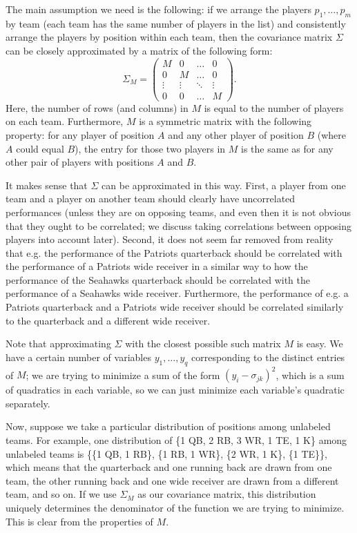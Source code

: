 \documentclass[12pt, final, onecolumn, titlepage]{article}
\theoremstyle{definition}
\begin{document}
The main assumption we need is the following: if we arrange the players $p_1, \dots, p_m$ by team (each team has the same number of players in the list) and consistently arrange the players by position within each team, then the covariance matrix $\Sigma$ can be closely approximated by a matrix of the following form:
\[\Sigma_M = \begin{pmatrix}M&0&\dots&0 \\ 0&M&\dots&0 \\ \vdots & \vdots & \ddots & \vdots \\ 0 & 0 & \dots & M\end{pmatrix}.\]
Here, the number of rows (and columns) in $M$ is equal to the number of players on each team. Furthermore, $M$ is a symmetric matrix with the following property: for any player of position $A$ and any other player of position $B$ (where $A$ could equal $B$), the entry for those two players in $M$ is the same as for any other pair of players with positions $A$ and $B$.

It makes sense that $\Sigma$ can be approximated in this way. First, a player from one team and a player on another team should clearly have uncorrelated performances (unless they are on opposing teams, and even then it is not obvious that they ought to be correlated; we discuss taking correlations between opposing players into account later). Second, it does not seem far removed from reality that e.g. the performance of the Patriots quarterback should be correlated with the performance of a Patriots wide receiver in a similar way to how the performance of the Seahawks quarterback should be correlated with the performance of a Seahawks wide receiver. Furthermore, the performance of e.g. a Patriots quarterback and a Patriots wide receiver should be correlated similarly to the quarterback and a different wide receiver.

Note that approximating $\Sigma$ with the closest possible such matrix $M$ is easy. We have a certain number of variables $y_1, \dots, y_q$ corresponding to the distinct entries of $M$; we are trying to minimize a sum of the form $(y_i - \sigma_{jk})^2$, which is a sum of quadratics in each variable, so we can just minimize each variable's quadratic separately.

Now, suppose we take a particular distribution of positions among unlabeled teams. For example, one distribution of \{1 QB, 2 RB, 3 WR, 1 TE, 1 K\} among unlabeled teams is \{\{1 QB, 1 RB\}, \{1 RB, 1 WR\}, \{2 WR, 1 K\}, \{1 TE\}\}, which means that the quarterback and one running back are drawn from one team, the other running back and one wide receiver are drawn from a different team, and so on. If we use $\Sigma_M$ as our covariance matrix, this distribution uniquely determines the denominator of the function we are trying to minimize. This is clear from the properties of $M$.
\end{document}
